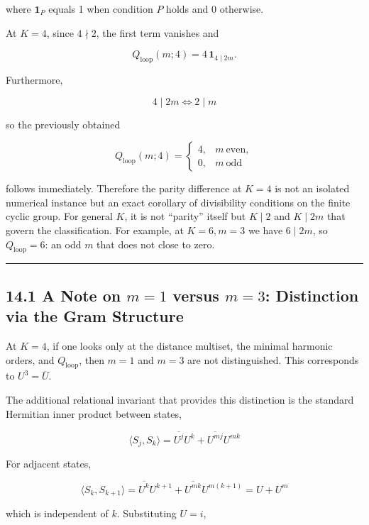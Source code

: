 \documentclass[
  a4paper,
]{article}
\begin{document}
where \(\mathbf 1_{P}\) equals 1 when condition \(P\) holds and 0
otherwise.

At \(K=4\), since \(4\nmid2\), the first term vanishes and

\[
Q_{\mathrm{loop}}(m;4)
=
4\,\mathbf 1_{4\mid2m}.
\]

Furthermore,

\[
4\mid2m
\iff
2\mid m
\]

so the previously obtained

\[
Q_{\mathrm{loop}}(m;4)
=
\begin{cases}
4,&m\ \mathrm{even},\\
0,&m\ \mathrm{odd}
\end{cases}
\]

follows immediately. Therefore the parity difference at \(K=4\) is not
an isolated numerical instance but an exact corollary of divisibility
conditions on the finite cyclic group. For general \(K\), it is not
``parity'' itself but \(K\mid2\) and \(K\mid2m\) that govern the
classification. For example, at \(K=6,m=3\) we have \(6\mid2m\), so
\(Q_{\mathrm{loop}}=6\): an odd \(m\) that does not close to zero.

\begin{center}\rule{0.5\linewidth}{0.5pt}\end{center}

\subsection{\texorpdfstring{14.1 A Note on \(m=1\) versus \(m=3\):
Distinction via the Gram
Structure}{14.1 A Note on m=1 versus m=3: Distinction via the Gram Structure}}\label{a-note-on-m1-versus-m3-distinction-via-the-gram-structure}

At \(K=4\), if one looks only at the distance multiset, the minimal
harmonic orders, and \(Q_{\mathrm{loop}}\), then \(m=1\) and \(m=3\) are
not distinguished. This corresponds to \(U^3=\overline U\).

The additional relational invariant that provides this distinction is
the standard Hermitian inner product between states,

\[
\langle S_j,S_k\rangle
=
\overline{U^j}U^k
+
\overline{U^{mj}}U^{mk}
\]

For adjacent states,

\[
\langle S_k,S_{k+1}\rangle
=
\overline{U^k}U^{k+1}
+
\overline{U^{mk}}U^{m(k+1)}
=
U+U^m
\]

which is independent of \(k\). Substituting \(U=i\),
\end{document}
